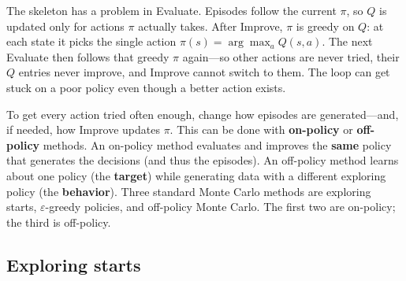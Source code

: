 The skeleton has a problem in Evaluate. Episodes follow the current $\pi$, so $Q$ is updated only for actions $\pi$ actually takes. After Improve, $\pi$ is greedy on $Q$: at each state it picks the single action $\pi(s)=\arg\max_a Q(s,a)$. The next Evaluate then follows that greedy $\pi$ again---so other actions are never tried, their $Q$ entries never improve, and Improve cannot switch to them. The loop can get stuck on a poor policy even though a better action exists.

To get every action tried often enough, change how episodes are generated---and, if needed, how Improve updates $\pi$. This can be done with \textbf{on-policy} or \textbf{off-policy} methods. An on-policy method evaluates and improves the \textbf{same} policy that generates the decisions (and thus the episodes). An off-policy method learns about one policy (the \textbf{target}) while generating data with a different exploring policy (the \textbf{behavior}). Three standard Monte Carlo methods are exploring starts, $\varepsilon$-greedy policies, and off-policy Monte Carlo. The first two are on-policy; the third is off-policy.

\subsection{Exploring starts}

